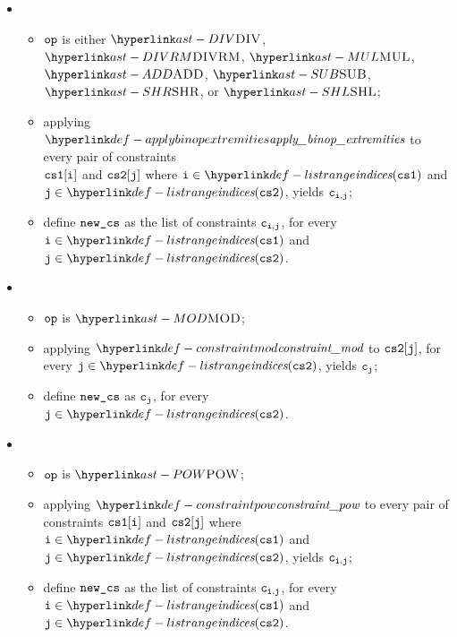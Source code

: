 \ProseParagraph
\OneApplies
\begin{itemize}
  \item {}
  \begin{itemize}
    \item $\op$ is either $\DIV$, $\DIVRM$, $\MUL$, $\ADD$, $\SUB$, $\SHR$, or $\SHL$;
    \item applying $\applybinopextremities$ to every pair of constraints \\
          $\csone[\vi]$ and $\cstwo[\vj]$ where $\vi\in\listrange(\csone)$ and
          $\vj\in\listrange(\cstwo)$, yields $\vc_{\vi,\vj}$;
    \item define $\newcs$ as the list of constraints $\vc_{\vi,\vj}$, for every
          $\vi\in\listrange(\csone)$ and $\vj\in\listrange(\cstwo)$.
  \end{itemize}

  \item {}
  \begin{itemize}
    \item $\op$ is $\MOD$;
    \item applying $\constraintmod$ to $\cstwo[\vj]$, for every $\vj\in\listrange(\cstwo)$, yields $\vc_\vj$;
    \item define $\newcs$ as $\vc_\vj$, for every $\vj\in\listrange(\cstwo)$.
  \end{itemize}

  \item {}
  \begin{itemize}
    \item $\op$ is $\POW$;
    \item applying $\constraintpow$ to every pair of constraints $\csone[\vi]$ and $\cstwo[\vj]$
          where $\vi\in\listrange(\csone)$ and $\vj\in\listrange(\cstwo)$, yields $\vc_{\vi,\vj}$;
    \item define $\newcs$ as the list of constraints $\vc_{\vi,\vj}$, for every
          $\vi\in\listrange(\csone)$ and $\vj\in\listrange(\cstwo)$.
  \end{itemize}
\end{itemize}

\FormallyParagraph
\begin{mathpar}
\end{mathpar}

